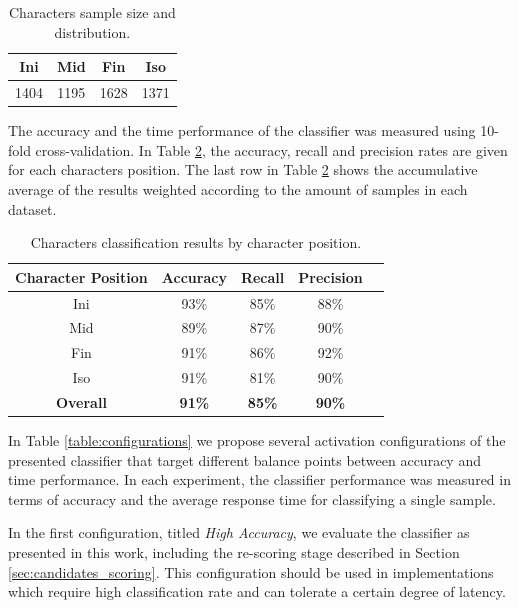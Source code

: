 \begin{table}[b]
\centering
\caption{Characters sample size and distribution.}
\begin{tabular}{ | c | c | c | c |}
\hline                 
  \textbf{Ini} & \textbf{Mid} & \textbf{Fin} & \textbf{Iso} \\ 
  \hline
  1404 & 1195 & 1628 & 1371 \\
  \hline
\end{tabular}
\label{table:sample_set} 
\end{table}

The accuracy and the time performance of the classifier was measured using 10-fold cross-validation.
In Table \ref{table:results_position}, the accuracy, recall and precision rates are given for each characters position.
The last row in Table \ref{table:results_position} shows the accumulative average of the results weighted according to the amount of samples in each dataset.

\begin{table}
\centering
\caption{Characters classification results by character position.}
\renewcommand{\arraystretch}{1.2}
\begin{tabular}{ | c | c | c | c | c |}
\hline
	\textbf{Character Position} & \textbf{Accuracy} & \textbf{Recall} &  \textbf{Precision} \\
	\hline 
	Ini & 93\% & 85\% & 88\% \\                
  	\hline
  	Mid & 89\% & 87\% & 90\% \\
  	\hline
  	Fin & 91\% &  86\% & 92\% \\
  	\hline
  	Iso & 91\% &  81\% & 90\% \\
  	\hline
  	\textbf{Overall} & \textbf{91\%} &  \textbf{85\%} & \textbf{90\%} \\
  	\hline
\end{tabular}
\label{table:results_position} 
\end{table}

In Table \ref{table:configurations} we propose several activation configurations of the presented classifier that target different balance points between accuracy and time performance.
In each experiment, the classifier performance was measured in terms of accuracy and the average response time for classifying a single sample.

In the first configuration, titled \emph{High Accuracy}, we evaluate the classifier as presented in this work, including the re-scoring stage described in Section \ref{sec:candidates_scoring}.
This configuration should be used in implementations which require high classification rate and can tolerate a certain degree of latency.


